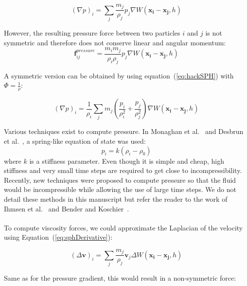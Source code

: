 \begin{equation}
\left(\nabla p\right)_{i} = \sum_{j} \frac{m_{j}}{\rho_{j}} p_{j} \nabla W(\mathbf{x_{i}}-\mathbf{x_{j}},h)
\end{equation}

However, the resulting pressure force between two particles $i$ and $j$ is not symmetric and therefore does not conserve linear and angular momentum:
\begin{equation}
\label{eq:nonSymmetricPressureForce}
\mathbf{f}^{pressure}_{ij} = \frac{m_{i}m_{j}}{\rho_{i}\rho_{j}}p_{j}\nabla W(\mathbf{x_{i}}-\mathbf{x_{j}},h)
\end{equation}

A symmetric version can be obtained by using equation~(\ref{eq:hackSPH}) with $\displaystyle \Phi = \frac{1}{\rho}$:

\begin{equation}
\label{eq:pressureGradientSPH}
\left(\nabla p\right)_{i} = 
\frac{1}{\rho_{i}}
\sum_{j} m_{j} \left( \frac{p_{i}}{\rho_{i}^{2}} + \frac{p_{j}}{\rho_{j}^{2}} \right) \nabla W(\mathbf{x_{i}}-\mathbf{x_{j}},h)
\end{equation}

Various techniques exist to compute pressure.
In Monaghan et al.~\cite{Monaghan1992} and Desbrun et al.~\cite{Desbrun1996}, a spring-like equation of state was used:
\begin{equation}
\label{eq:pressureSPH}
p_{i} = k\left(\rho_{i}-\rho_{0}\right)
\end{equation}
where $k$ is a stiffness parameter. 
Even though it is simple and cheap, high stiffness and very small time steps are required to get close to incompressibility.
Recently, new techniques were proposed to compute pressure so that the fluid would be incompressible while allowing the use of large time steps.
We do not detail these methods in this manuscript but refer the reader to the work of Ihmsen et al.~\cite{Ihmsen2014:IISPH} and Bender and Koschier~\cite{Bender2015}.
\\ \\
To compute viscosity forces, we could approximate the Laplacian of the velocity using Equation~(\ref{eq:sphDerivative}):

\begin{equation}
\left(\Delta \mathbf{v}\right)_{i} = \sum_{j} \frac{m_{j}}{\rho_{j}} \mathbf{v}_{j} \Delta W(\mathbf{x_{i}}-\mathbf{x_{j}},h)
\end{equation}

Same as for the pressure gradient, this would result in a non-symmetric force:

